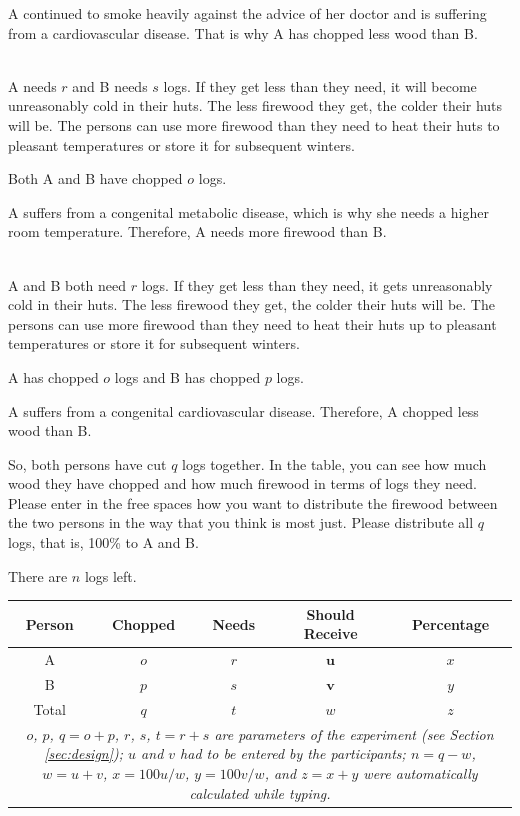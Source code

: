 \documentclass[smallcondensed]{svjour3}
\begin{document}
%
A continued to smoke heavily against the advice of her doctor and is suffering from a cardiovascular disease. That is why A has chopped less wood than B.\par
%
\vspace{1ex}
\\
A needs $r$ and B needs $s$ logs. If they get less than they need, it will become unreasonably cold in their huts. The less firewood they get, the colder their huts will be. The persons can use more firewood than they need to heat their huts to pleasant temperatures or store it for subsequent winters.\par
%
Both A and B have chopped $o$ logs.\par
%
A suffers from a congenital metabolic disease, which is why she needs a higher room temperature. Therefore, A needs more firewood than B.\par
%
\vspace{1ex}
\\
A and B both need $r$ logs. If they get less than they need, it gets unreasonably cold in their huts. The less firewood they get, the colder their huts will be. The persons can use more firewood than they need to heat their huts up to pleasant temperatures or store it for subsequent winters.\par
%
A has chopped $o$ logs and B has chopped $p$ logs.\par
%
A suffers from a congenital cardiovascular disease. Therefore, A chopped less wood than B.\par
%
\vspace{1ex}
\noindent So, both persons have cut $q$ logs together. In the table, you can see how much wood they have chopped and how much firewood in terms of logs they need. Please enter in the free spaces how you want to distribute the firewood between the two persons in the way that you think is most just. Please distribute all $q$ logs, that is, 100\% to A and B.\par
%
There are $n$ logs left.\par
%
\vspace{1ex}
\begin{center}
\begin{tabularx}{8.5cm}{ccccc}\hline
   Person   & Chopped   & Needs	  & Should Receive   & Percentage   \\\hline\hline
   A        & $o$       & $r$     & $\mathbf{u}$     & $x$          \\
   B        & $p$       & $s$     & $\mathbf{v}$     & $y$          \\\hline
   Total    & $q$       & $t$     & $w$              & $z$          \\\hline
\multicolumn{5}{p{8cm}}{\footnotesize \textit{$o$, $p$, $q=o+p$, $r$, $s$, $t=r+s$ are parameters of the experiment (see Section \ref{sec:design}); $u$ and $v$ had to be entered by the participants; $n=q-w$, $w=u+v$, $x=100u/w$, $y=100v/w$, and $z=x+y$ were automatically calculated while typing.}}
\end{tabularx}
\end{center}
\par
%
\end{document}
